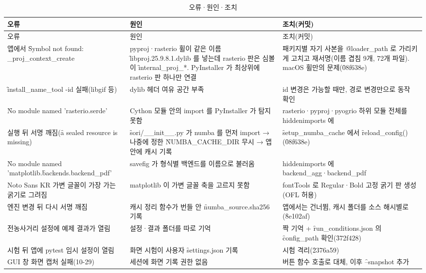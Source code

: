 \documentclass[10.5pt,a4paper]{article}
\begin{document}
\begin{longtable}{P{44mm}P{54mm}P{55mm}}
\caption{오류·원인·조치}\label{tab:errors}\\
\toprule
오류 & 원인 & 조치(커밋) \\ \midrule\endfirsthead
\toprule 오류 & 원인 & 조치(커밋) \\ \midrule\endhead
앱에서 \f{Symbol not found: \_proj\_context\_create} & pyproj·rasterio 휠이 같은 이름 \f{libproj.25.9.8.1.dylib} 를 넣는데 rasterio 판은 심볼이 \f{internal\_proj\_*}. PyInstaller 가 최상위에 rasterio 판 하나만 연결 & 패키지별 자기 사본을 \f{@loader\_path} 로 가리키게 고치고 재서명(이름 겹침 9개, 72개 파일). macOS 휠만의 문제(\f{08f638e}) \\
\f{install\_name\_tool -id} 실패(libgif 등) & dylib 헤더 여유 공간 부족 & id 변경은 가능할 때만, 경로 변경만으로 동작 확인 \\
\f{No module named 'rasterio.serde'} & Cython 모듈 안의 import 를 PyInstaller 가 탐지 못함 & rasterio·pyproj·pyogrio 하위 모듈 전체를 hiddenimports 에 \\
실행 뒤 서명 깨짐(\f{a sealed resource is missing}) & \f{sori/\_\_init\_\_.py} 가 numba 를 먼저 import → 나중에 정한 \f{NUMBA\_CACHE\_DIR} 무시 → 앱 안에 캐시 기록 & \f{setup\_numba\_cache} 에서 \f{reload\_config()}(\f{08f638e}) \\
\f{No module named 'matplotlib.}\allowbreak\f{backends.backend\_pdf'} & savefig 가 형식별 백엔드를 이름으로 불러옴 & hiddenimports 에 backend\_agg·backend\_pdf \\
Noto Sans KR 가변 글꼴이 가장 가는 굵기로 그려짐 & matplotlib 이 가변 글꼴 축을 고르지 못함 & fontTools 로 Regular·Bold 고정 굵기 판 생성(OFL 허용) \\
엔진 변경 뒤 다시 서명 깨짐 & 캐시 정리 함수가 번들 안 \f{numba\_source.sha256} 기록 & 앱에서는 건너뜀, 캐시 폴더를 소스 해시별로(\f{8e102af}) \\
전농사거리 설정에 예제 결과가 열림 & 설정·결과 폴더를 따로 기억 & 짝 기억 + \f{run\_conditions.json} 의 \f{config\_path} 확인(\f{372f428}) \\
시험 뒤 앱에 pytest 임시 설정이 열림 & 화면 시험이 사용자 \f{settings.json} 기록 & 시험 격리(\f{2376a59}) \\
GUI 창 화면 캡처 실패(10-29) & 세션에 화면 기록 권한 없음 & 버튼 함수 호출로 대체, 이후 \f{--snapshot} 추가 \\
\bottomrule
\end{longtable}

\end{document}
